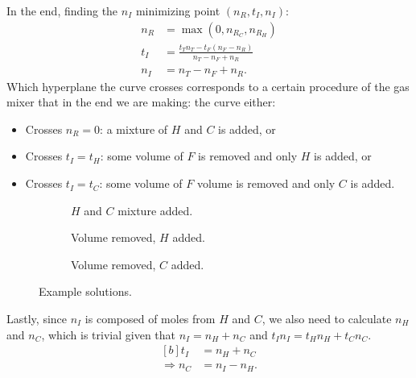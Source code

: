 \documentclass{article}
\begin{document}
In the end, finding the $n_I$ minimizing point $(n_R,t_I,n_I)$:
\begin{align}
    n_R &= \max(0, n_{R_C}, n_{R_H}) \label{eq:nR} \\
    t_I &= \frac{t_T n_T-t_F(n_F-n_R)}{n_T-n_F+n_R} \label{eq:tI} \\
    n_I &= n_T-n_F+n_R. \label{eq:nI}
\end{align}
Which hyperplane the curve crosses corresponds to a certain procedure of
the gas mixer that in the end we are making:
the curve either:
\begin{itemize}
    \item Crosses $n_R=0$:
        a mixture of $H$ and $C$ is added, or
    \item Crosses $t_I=t_H$:
        some volume of $F$ is removed and only $H$ is added, or
    \item Crosses $t_I=t_C$:
        some volume of $F$ volume is removed and only $C$ is added.
\end{itemize}
\begin{figure}
    \begin{center}
        \begin{subfigure}{0.48\textwidth}
            \caption{$H$ and $C$ mixture added.}
        \end{subfigure}
        \vspace{1em}

        \begin{subfigure}{0.48\textwidth}
            \caption{Volume removed, $H$ added.}
        \end{subfigure}
        \begin{subfigure}{0.48\textwidth}
            \caption{Volume removed, $C$ added.}
        \end{subfigure}
    \end{center}
    \caption{%
        Example solutions.
    }
\end{figure}
Lastly, since $n_I$ is composed of moles from $H$ and $C$,
we also need to calculate $n_H$ and $n_C$,
which is trivial given that $n_I=n_H+n_C$ and $t_I n_I=t_H n_H+t_C n_C$.
\begin{equation}\label{eq:nC}
    \begin{aligned}[b]
        t_I &= n_H+n_C \\
        \Rightarrow n_C &= n_I-n_H.
    \end{aligned}
\end{equation}
\end{document}
